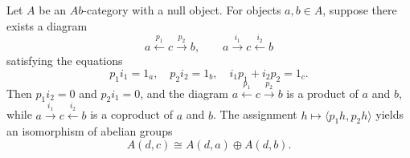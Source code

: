 Let $A$ be an $\textit{Ab}$-category with a null object. For objects $a, b \in A$, suppose there exists a diagram
$$
a \xleftarrow{p_1} c \xrightarrow{p_2} b, \qquad a \xrightarrow{i_1} c \xleftarrow{i_2} b
$$
satisfying the equations
$$
p_1 i_1 = 1_a, \quad p_2 i_2 = 1_b, \quad i_1 p_1 + i_2 p_2 = 1_c. \tag{2}
$$
Then $p_1 i_2 = 0$ and $p_2 i_1 = 0$, and the diagram $a \xleftarrow{p_1} c \xrightarrow{p_2} b$ is a product of $a$ and $b$, while $a \xrightarrow{i_1} c \xleftarrow{i_2} b$ is a coproduct of $a$ and $b$. The assignment $h \mapsto \langle p_1 h, p_2 h \rangle$ yields an isomorphism of abelian groups
$$
A(d, c) \cong A(d, a) \oplus A(d, b).
$$
